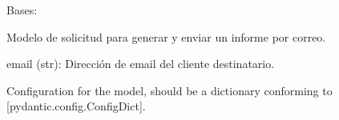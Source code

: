 \documentclass[letterpaper,10pt,spanish]{sphinxmanual}
\begin{document}
\begin{fulllineitems}
\label{\detokenize{endpoints:main.InformeRequest}}
\pysigstartsignatures
\pysiglinewithargsret
{}
{\sphinxparamcomma {}}
{}
\pysigstopsignatures
\sphinxAtStartPar
Bases: 

\sphinxAtStartPar
Modelo de solicitud para generar y enviar un informe por correo.
\begin{description}
\sphinxAtStartPar
email (str): Dirección de email del cliente destinatario.

\end{description}

\begin{fulllineitems}
\label{\detokenize{endpoints:main.InformeRequest.email}}
\pysigstartsignatures
\pysigline
{}
\pysigstopsignatures
\end{fulllineitems}


\begin{fulllineitems}
\label{\detokenize{endpoints:main.InformeRequest.model_config}}
\pysigstartsignatures
\pysigline
{}
\pysigstopsignatures
\sphinxAtStartPar
Configuration for the model, should be a dictionary conforming to {[}\sphinxtitleref{ConfigDict}{]}{[}pydantic.config.ConfigDict{]}.

\end{fulllineitems}


\end{fulllineitems}

\end{document}
